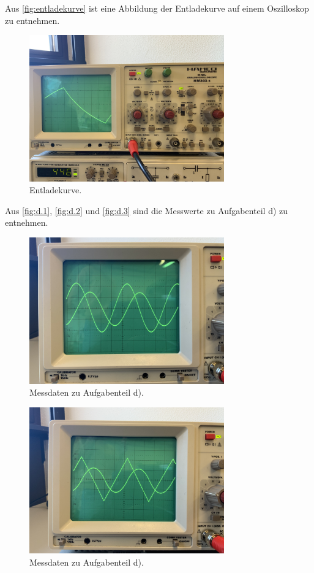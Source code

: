 Aus \autoref{fig:entladekurve} ist eine Abbildung der Entladekurve auf einem Oszilloskop zu entnehmen.
\begin{figure}[H]
    \centering
    \includegraphics[width=0.75\textwidth]{Dateien/entladekurve.jpeg}
    \caption{Entladekurve.}
    \label{fig:entladekurve}
\end{figure}

Aus \autoref{fig:d.1}, \autoref{fig:d.2} und \autoref{fig:d.3} sind die Messwerte zu Aufgabenteil d) zu entnehmen.
\begin{figure}[H]
    \centering
    \includegraphics[width=0.75\textwidth]{Dateien/d.1.jpeg}
    \caption{Messdaten zu Aufgabenteil d).}
    \label{fig:d.1}
\end{figure}

\begin{figure}[H]
    \centering
    \includegraphics[width=0.75\textwidth]{Dateien/d.2.jpeg}
    \caption{Messdaten zu Aufgabenteil d).}
    \label{fig:d.2}
\end{figure}

